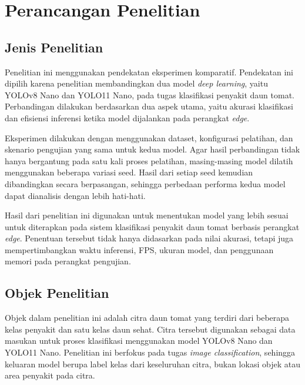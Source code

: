 \section{Perancangan Penelitian}
\begin{sectioncontent}
\subsection{Jenis Penelitian}
\begin{subsectioncontent}
    \hspace{\parindent}Penelitian ini menggunakan pendekatan eksperimen komparatif. Pendekatan ini dipilih karena penelitian membandingkan dua model \textit{deep learning}, yaitu YOLOv8 Nano dan YOLO11 Nano, pada tugas klasifikasi penyakit daun tomat. Perbandingan dilakukan berdasarkan dua aspek utama, yaitu akurasi klasifikasi dan efisiensi inferensi ketika model dijalankan pada perangkat \textit{edge}.

    Eksperimen dilakukan dengan menggunakan dataset, konfigurasi pelatihan, dan skenario pengujian yang sama untuk kedua model. Agar hasil perbandingan tidak hanya bergantung pada satu kali proses pelatihan, masing-masing model dilatih menggunakan beberapa variasi seed. Hasil dari setiap seed kemudian dibandingkan secara berpasangan, sehingga perbedaan performa kedua model dapat dianalisis dengan lebih hati-hati.

    Hasil dari penelitian ini digunakan untuk menentukan model yang lebih sesuai untuk diterapkan pada sistem klasifikasi penyakit daun tomat berbasis perangkat \textit{edge}. Penentuan tersebut tidak hanya didasarkan pada nilai akurasi, tetapi juga mempertimbangkan waktu inferensi, FPS, ukuran model, dan penggunaan memori pada perangkat pengujian.
\end{subsectioncontent}

\subsection{Objek Penelitian}
\begin{subsectioncontent}
    \hspace{\parindent}Objek dalam penelitian ini adalah citra daun tomat yang terdiri dari beberapa kelas penyakit dan satu kelas daun sehat. Citra tersebut digunakan sebagai data masukan untuk proses klasifikasi menggunakan model YOLOv8 Nano dan YOLO11 Nano. Penelitian ini berfokus pada tugas \textit{image classification}, sehingga keluaran model berupa label kelas dari keseluruhan citra, bukan lokasi objek atau area penyakit pada citra.


\end{subsectioncontent}
\end{sectioncontent}
